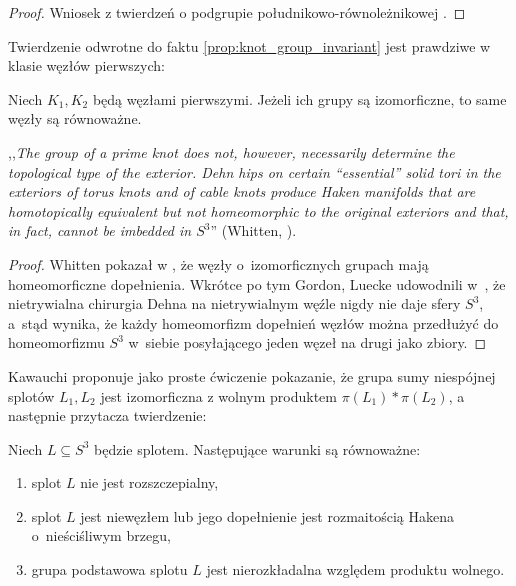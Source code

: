 \begin{proof}
    Wniosek z twierdzeń o podgrupie południkowo-równoleżnikowej \cite[s. 75]{kawauchi96}.
\end{proof}

Twierdzenie odwrotne do faktu \ref{prop:knot_group_invariant} jest prawdziwe w klasie węzłów pierwszych:

\begin{proposition}
    Niech $K_1, K_2$ będą węzłami pierwszymi.
    Jeżeli ich grupy są izomorficzne, to same węzły są równoważne.
\end{proposition}

,,\emph{The group of a prime knot does not, however, necessarily determine the topological type of the exterior. Dehn hips on certain “essential” solid tori in the exteriors of torus knots and of cable knots produce Haken manifolds that are homotopically equivalent but not homeomorphic to the original exteriors and that, in fact, cannot be imbedded in $S^3$}'' (Whitten, \cite{whitten87}).

\begin{proof}
%
%
%
    Whitten pokazał w \cite{whitten87}, że węzły o~izomorficznych grupach mają homeomorficzne dopełnienia.
    Wkrótce po tym Gordon, Luecke udowodnili w~\cite{gordon89}, że nietrywialna chirurgia Dehna na nietrywialnym węźle nigdy nie daje sfery $S^3$, a~stąd wynika, że każdy homeomorfizm dopełnień węzłów można przedłużyć do homeomorfizmu $S^3$ w~siebie posyłającego jeden węzeł na drugi jako zbiory.
\end{proof}

Kawauchi proponuje jako proste ćwiczenie \cite[s. 73]{kawauchi96} pokazanie, że grupa sumy niespójnej splotów $L_1, L_2$ jest izomorficzna z wolnym produktem $\pi(L_1) * \pi(L_2)$, a następnie przytacza twierdzenie:

\begin{proposition}

    Niech $L \subseteq S^3$ będzie splotem.
    Następujące warunki są równoważne:
    \begin{enumerate}
        \item splot $L$ nie jest rozszczepialny,
        \item splot $L$ jest niewęzłem lub jego dopełnienie jest rozmaitością Hakena o~nieściśliwym brzegu,
%
        \item grupa podstawowa splotu $L$ jest nierozkładalna względem produktu wolnego.
    \end{enumerate}
\end{proposition}

